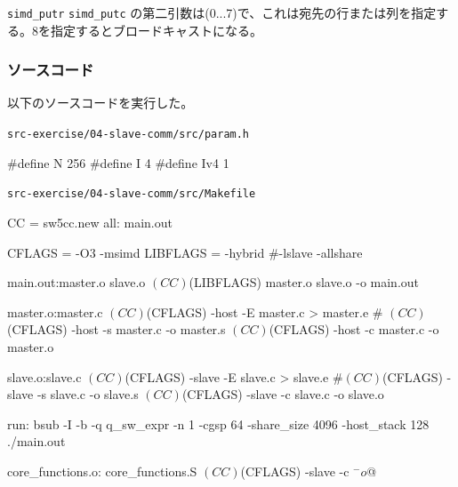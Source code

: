 \verb`simd_putr`
\verb`simd_putc`
の第二引数は(0...7)で、これは宛先の行または列を指定する。8を指定するとブロードキャストになる。



\subsubsection{ソースコード}
以下のソースコードを実行した。

\verb`src-exercise/04-slave-comm/src/param.h`
\begin{code}
#define N 256
#define I 4
#define Iv4 1

\end{code}

\verb`src-exercise/04-slave-comm/src/Makefile`
\begin{code}
CC = sw5cc.new
all: main.out

CFLAGS = -O3 -msimd
LIBFLAGS = -hybrid #-lslave -allshare

main.out:master.o slave.o
	$(CC) $(LIBFLAGS) master.o slave.o -o main.out

master.o:master.c
	$(CC) $(CFLAGS) -host -E master.c > master.e
	#	$(CC) $(CFLAGS) -host -s master.c -o master.s
	$(CC) $(CFLAGS) -host -c master.c -o master.o

slave.o:slave.c
	$(CC) $(CFLAGS) -slave -E slave.c > slave.e
	#$(CC) $(CFLAGS) -slave -s slave.c -o slave.s
	$(CC) $(CFLAGS) -slave -c slave.c -o slave.o

run:
	bsub -I -b -q q_sw_expr -n 1 -cgsp 64 -share_size 4096 -host_stack 128 ./main.out

core_functions.o: core_functions.S
	$(CC) $(CFLAGS) -slave -c $^ -o $@

\end{code}

